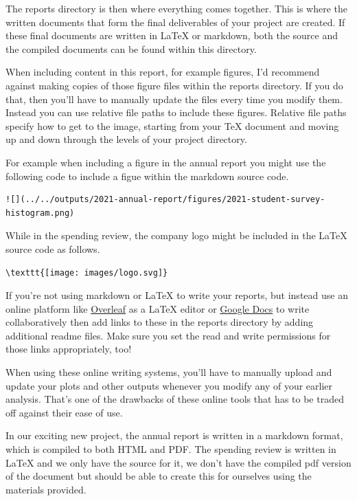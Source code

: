 \documentclass[
  letterpaper,
  DIV=11,
  numbers=noendperiod]{scrreprt}
\begin{document}
The reports directory is then where everything comes together. This is
where the written documents that form the final deliverables of your
project are created. If these final documents are written in LaTeX or
markdown, both the source and the compiled documents can be found within
this directory.

When including content in this report, for example figures, I'd
recommend against making copies of those figure files within the reports
directory. If you do that, then you'll have to manually update the files
every time you modify them. Instead you can use relative file paths to
include these figures. Relative file paths specify how to get to the
image, starting from your TeX document and moving up and down through
the levels of your project directory.

For example when including a figure in the annual report you might use
the following code to include a figue within the markdown source code.

\begin{verbatim}
![](../../outputs/2021-annual-report/figures/2021-student-survey-histogram.png)
\end{verbatim}

While in the spending review, the company logo might be included in the
LaTeX source code as follows.

\begin{verbatim}
\texttt{[image: images/logo.svg]}
\end{verbatim}

If you're not using markdown or LaTeX to write your reports, but instead
use an online platform like \href{https://www.overleaf.com/}{Overleaf}
as a LaTeX editor or \href{https://docs.google.com/}{Google Docs} to
write collaboratively then add links to these in the reports directory
by adding additional readme files. Make sure you set the read and write
permissions for those links appropriately, too!

When using these online writing systems, you'll have to manually upload
and update your plots and other outputs whenever you modify any of your
earlier analysis. That's one of the drawbacks of these online tools that
has to be traded off against their ease of use.

In our exciting new project, the annual report is written in a markdown
format, which is compiled to both HTML and PDF. The spending review is
written in LaTeX and we only have the source for it, we don't have the
compiled pdf version of the document but should be able to create this
for ourselves using the materials provided.
\end{document}
